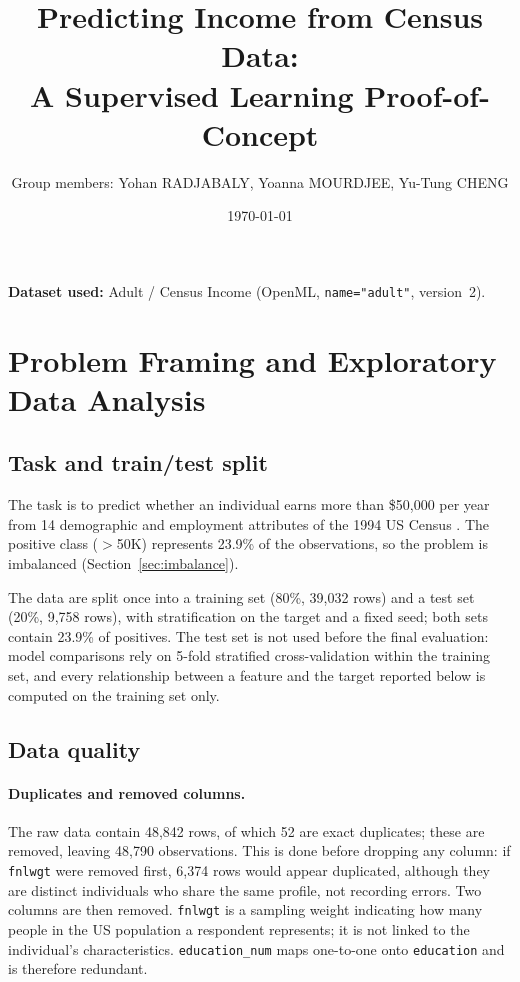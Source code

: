 \documentclass[10pt,a4paper]{article}
\title{Predicting Income from Census Data:\\ A Supervised Learning Proof-of-Concept}
\author{Group members: Yohan RADJABALY, Yoanna MOURDJEE, Yu-Tung CHENG}
\date{\today}
\newcommand{\high}{$>$50K}
\begin{document}
\maketitle

\noindent\textbf{Dataset used:} Adult / Census Income (OpenML, \texttt{name="adult"}, version~2).

\section{Problem Framing and Exploratory Data Analysis}

\subsection{Task and train/test split}
The task is to predict whether an individual earns more than \$50{,}000 per year from 14
demographic and employment attributes of the 1994 US Census \cite{kohavi1996}. The
positive class (\high{}) represents 23.9\% of the observations, so the problem is
imbalanced (Section~\ref{sec:imbalance}).

The data are split once into a training set (80\%, 39{,}032 rows) and a test set (20\%,
9{,}758 rows), with stratification on the target and a fixed seed; both sets contain
23.9\% of positives. The test set is not used before the final evaluation: model
comparisons rely on 5-fold stratified cross-validation within the training set, and every
relationship between a feature and the target reported below is computed on the training
set only.

\subsection{Data quality}

\paragraph{Duplicates and removed columns.}
The raw data contain 48{,}842 rows, of which 52 are exact duplicates; these are removed,
leaving 48{,}790 observations. This is done before dropping any column: if \texttt{fnlwgt}
were removed first, 6{,}374 rows would appear duplicated, although they are distinct
individuals who share the same profile, not recording errors. Two columns are then
removed. \texttt{fnlwgt} is a sampling weight indicating how many people in the US
population a respondent represents; it is not linked to the individual's
characteristics. \texttt{education\_num} maps one-to-one onto \texttt{education} and is
therefore redundant.
\end{document}
